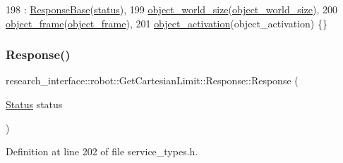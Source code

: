 \begin{DoxyCode}
198         : \hyperlink{structresearch__interface_1_1robot_1_1ResponseBase_a10b3259c2dfd5ed4c4297e5993245fff}{ResponseBase}(\hyperlink{structresearch__interface_1_1robot_1_1ResponseBase_a99bb821172a0ac77338cd8e0acbe8a96}{status}),
199           \hyperlink{structresearch__interface_1_1robot_1_1GetCartesianLimit_1_1Response_a0f7f582f1128d7945f8be5d7b8135a42}{object\_world\_size}(\hyperlink{structresearch__interface_1_1robot_1_1GetCartesianLimit_1_1Response_a0f7f582f1128d7945f8be5d7b8135a42}{object\_world\_size}),
200           \hyperlink{structresearch__interface_1_1robot_1_1GetCartesianLimit_1_1Response_ae08bd0aef674163b601408d225e0386b}{object\_frame}(\hyperlink{structresearch__interface_1_1robot_1_1GetCartesianLimit_1_1Response_ae08bd0aef674163b601408d225e0386b}{object\_frame}),
201           \hyperlink{structresearch__interface_1_1robot_1_1GetCartesianLimit_1_1Response_a107369740e060e2fff3ae01784a09eee}{object\_activation}(object\_activation) \{\}
\end{DoxyCode}
\mbox{\label{structresearch__interface_1_1robot_1_1GetCartesianLimit_1_1Response_ae2305bdf64d0d365ebd4f3934df11f37}} 
\subsubsection{\texorpdfstring{Response()}{Response()}\hspace{0.1cm}{\footnotesize\ttfamily [2/2]}}
{\footnotesize\ttfamily research\+\_\+interface\+::robot\+::\+Get\+Cartesian\+Limit\+::\+Response\+::\+Response (\begin{DoxyParamCaption}\item[{\hyperlink{structresearch__interface_1_1robot_1_1CommandBase_a63ff74649dc636bd79dc0dd34fb84df5}{Status}}]{status }\end{DoxyParamCaption})\hspace{0.3cm}{\ttfamily [inline]}}



Definition at line 202 of file service\+\_\+types.\+h.


